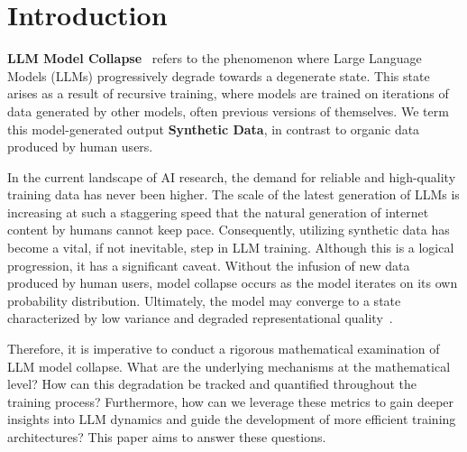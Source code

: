 \documentclass{article}
\theoremstyle{plain}
\theoremstyle{definition}
\theoremstyle{remark}
\newcommand{\gy}[1]{\textcolor{PineGreen}{\bf [Yi: #1]}}
\begin{document}
\section{Introduction}
\label{sec:background}
\textbf{LLM Model Collapse}~\cite{shumailov2024,Shumailov2024-dj} refers to the phenomenon where Large Language Models (LLMs) progressively degrade towards a degenerate state. This state arises as a result of recursive training, where models are trained on iterations of data generated by other models, often previous versions of themselves. We term this model-generated output \textbf{Synthetic Data}, in contrast to organic data produced by human users.

In the current landscape of AI research, the demand for reliable and high-quality training data has never been higher. The scale of the latest generation of LLMs is increasing at such a staggering speed that the natural generation of internet content by humans cannot keep pace. Consequently, utilizing synthetic data has become a vital, if not inevitable, step in LLM training. Although this is a logical progression, it has a significant caveat. Without the infusion of new data produced by human users, model collapse occurs as the model iterates on its own probability distribution. Ultimately, the model may converge to a state characterized by low variance and degraded representational quality~\cite{shumailov2024, Shumailov2024-dj}.

Therefore, it is imperative to conduct a rigorous mathematical examination of LLM model collapse. What are the underlying mechanisms at the mathematical level? How can this degradation be tracked and quantified throughout the training process? Furthermore, how can we leverage these metrics to gain deeper insights into LLM dynamics and guide the development of more efficient training architectures? This paper aims to answer these questions.
\end{document}
